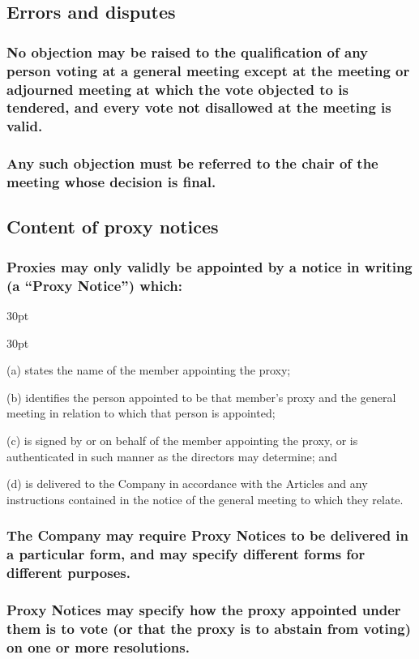 \documentclass[12pt]{article}
\def\clauseindent{30pt}
\newenvironment{subindentlist}{\begin{adjustwidth}{\clauseindent}{}\begin{labeledlist}{\clauseindent}}{\end{labeledlist}\end{adjustwidth}}
\begin{document}
\subsection{Errors and disputes}
\subsubsection{No objection may be raised to the qualification of any person voting at a general meeting except at the meeting or adjourned meeting at which the vote objected to is tendered, and every vote not disallowed at the meeting is valid.}
\subsubsection{Any such objection must be referred to the chair of the meeting whose decision is final.}

\subsection{Content of proxy notices}
\subsubsection{Proxies may only validly be appointed by a notice in writing (a ``Proxy Notice'') which:}
\begin{subindentlist}
    \item [(a)] states the name of the member appointing the proxy;
    \item [(b)] identifies the person appointed to be that member's proxy and the general meeting in relation to which that person is appointed;
    \item [(c)] is signed by or on behalf of the member appointing the proxy, or is authenticated in such manner as the directors may determine; and
    \item [(d)] is delivered to the Company in accordance with the Articles and any instructions contained in the notice of the general meeting to which they relate.
\end{subindentlist}
\subsubsection{The Company may require Proxy Notices to be delivered in a particular form, and may specify different forms for different purposes.}
\subsubsection{Proxy Notices may specify how the proxy appointed under them is to vote (or that the proxy is to abstain from voting) on one or more resolutions.}
\end{document}

